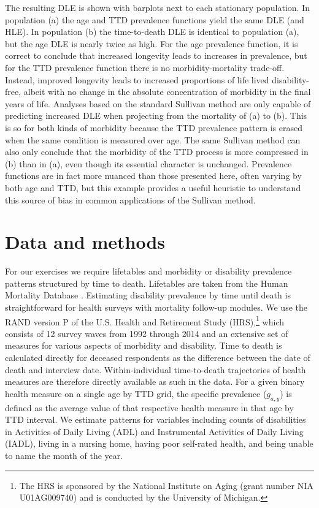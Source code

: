 \documentclass[12pt,oneside,a4paper]{article} %
\begin{document}
The resulting DLE is shown with
barplots next to each stationary population.
In population (a) the age and TTD prevalence functions yield
the same DLE (and HLE). In population (b) the time-to-death DLE is identical to
population (a), but the age DLE is nearly twice as high. For the
age prevalence function, it is correct to conclude that increased longevity leads to
increases in prevalence, but for the TTD prevalence function there is
no morbidity-mortality trade-off. Instead, improved longevity leads to increased proportions of life
lived disability-free, albeit with no change in the absolute concentration of morbidity in the final years of life. Analyses
based on the standard Sullivan method \citep{Sullivan1970} are only capable of
predicting increased DLE when projecting from the mortality of (a) to (b). This
is so for both kinds of morbidity because the TTD prevalence pattern
is erased when the same condition is measured over age. The same
Sullivan method can also only conclude that the morbidity of the TTD
process is more compressed in (b) than in (a), even though its essential
character is unchanged. Prevalence functions are in fact more nuanced than those
presented here, often varying by both age and TTD, but this example provides a useful heuristic to understand this source of bias in common applications of the Sullivan method.

\section{Data and methods}
\label{sec:datamethods}
For our exercises we require lifetables and morbidity or disability prevalence patterns structured by time to death. Lifetables are taken from the Human Mortality Database \citep{HMD2018}. Estimating disability prevalence by time until death is straightforward for health surveys with mortality follow-up modules. We use the RAND version P of the U.S. Health and Retirement Study (HRS),\footnote{The HRS is sponsored by the National Institute on Aging (grant number NIA U01AG009740) and is conducted by the University of Michigan.} which consists of 12 survey waves from 1992 through 2014 and an extensive set of measures for various aspects of morbidity and disability. Time to death is calculated directly for deceased respondents as the difference between the date of death and interview date. Within-individual time-to-death trajectories of health measures are therefore directly available as such in the data. For a given binary health measure on a single age by TTD grid, the specific prevalence ($g_{a,y}$) is defined as the average value of that respective health measure in that age by TTD interval. We estimate patterns for variables including
counts of disabilities in Activities of Daily Living (ADL) and
Instrumental Activities of Daily Living (IADL), living in a nursing home, having poor
self-rated health, and being unable to name the month of the year.
\end{document}
